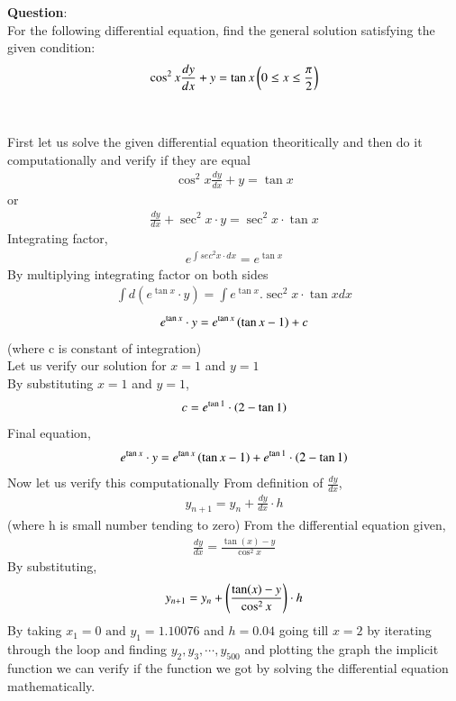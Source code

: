 \documentclass[journal]{IEEEtran}
\begin{document}
\textbf{Question}:\\
For the following differential equation, find the general solution satisfying the given condition:\\
$$\cos^2{x}\frac{dy}{dx}+y=\tan{x} \left(0\le x\le\frac{\pi}{2}\right)$$\\
\solution \\
First let us solve the given differential equation theoritically and then do it computationally and verify if they are equal \\
\begin{align}
   \cos^2{x}\frac{dy}{dx}+y=\tan{x}
\end{align}
or \begin{align}
    \frac{dy}{dx} + \sec^2{x}\cdot y= \sec^2{x}\cdot \tan{x}
\end{align}
Integrating factor,
\begin{align}
    e^{\int{sec^2{x}}\cdot dx}=e^{\tan{x}}
\end{align}
By multiplying integrating factor on both sides
\begin{align}
    \int{d(e^{\tan{x}}\cdot y)}=\int{e^{\tan{x}}. \sec^2{x}\cdot \tan{x}dx}
\end{align}
\begin{align}
e^{\tan{x}}\cdot y=e^{\tan{x}}\left(\tan{x}-1\right) + c
\end{align}
(where c is constant of integration)\\
Let us verify our solution for $x=1$ and $y=1$\\
By substituting $x=1$ and $y=1$,\begin{align}
    c=e^{\tan{1}}\cdot \left(2-\tan{1}\right)
\end{align}
Final equation,
\begin{align}
    e^{\tan{x}}\cdot y=e^{\tan{x}}\left(\tan{x}-1\right) + e^{\tan{1}}\cdot \left(2-\tan{1}\right)
\end{align}
Now let us verify this computationally
From definition of $\frac{dy}{dx}$,
\begin{align}
    y_{n+1}=y_{n}+\frac{dy}{dx}\cdot h    
\end{align}
(where h is small number tending to zero)
From the differential equation given,
\begin{align}
    \frac{dy}{dx}=\frac{\tan(x)-y}{\cos^2{x}}
\end{align}
By substituting,
\begin{align}
    y_{n+1}=y_{n}+\left(\frac{\tan(x)-y}{\cos^2{x}}\right)\cdot h
\end{align}
By taking $x_1=0 \text{ and } y_1=1.10076$  and $h=0.04$ going till $x=2$ by iterating through the loop and finding $y_2,y_3,\cdots , y_{500}$ and plotting the graph the implicit function we can verify if the function we got by solving the differential equation mathematically.
\end{document}
